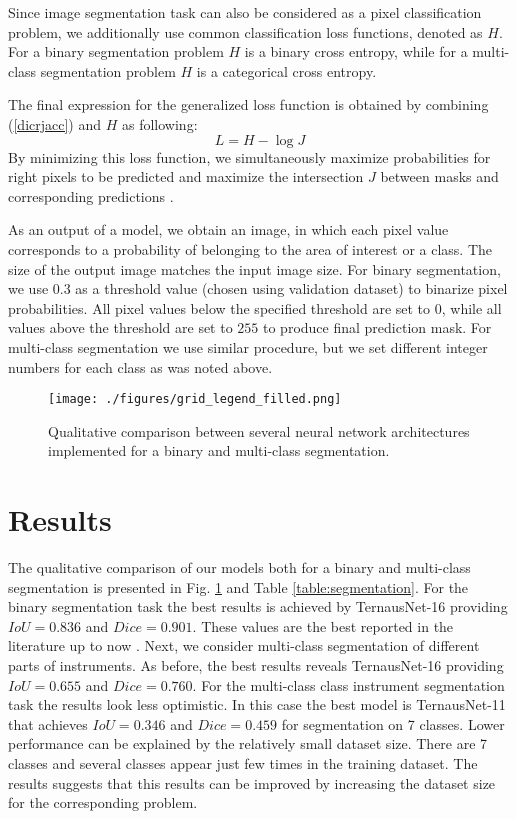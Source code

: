 \documentclass[runningheads,a4paper]{llncs}[2015/06/24]
\begin{document}
Since image segmentation task can also be considered as a pixel classification problem, we additionally use common classification loss functions, denoted as $H$. For a binary segmentation problem $H$ is a binary cross entropy, while for a multi-class segmentation problem $H$ is a categorical cross entropy.

The final expression for the generalized loss function is obtained by combining (\ref{dicrjacc}) and $H$ as following:
\begin{equation}
\label{free_en}
L=H-\log J
\end{equation}
By minimizing this loss function, we simultaneously maximize probabilities for right pixels to be predicted and maximize the intersection $J$ between masks and corresponding predictions \cite{iglovikov2017satellite}.

As an output of a model, we obtain an image, in which each pixel value corresponds to a probability of belonging to the area of interest or a class. The size of the output image matches the input image size. For binary segmentation, we use $0.3$ as a threshold value (chosen using validation dataset) to binarize pixel probabilities. All pixel values below the specified threshold are set to $0$, while all values above the threshold are set to $255$ to produce final prediction mask. For multi-class segmentation we use similar procedure, but we set different integer numbers for each class as was noted above.

\begin{figure}[!t]
\centering
\texttt{[image: ./figures/grid\_legend\_filled.png]}
\caption{Qualitative comparison between several  neural network architectures implemented for a binary and multi-class segmentation.}
\label{fig::grid_legend}
\end{figure}

\section{Results}
The qualitative comparison of our models both for a binary and multi-class segmentation is presented in Fig. \ref{fig::grid_legend} and Table \ref{table:segmentation}. For the binary segmentation task the best results is achieved by TernausNet-16 providing $IoU = 0.836$ and $Dice = 0.901$. These values are the best reported in the literature up to now \cite{pakhomov2017deep, garcia2017toolnet}. Next, we consider multi-class segmentation of different parts of instruments. As before, the best results reveals TernausNet-16 providing $IoU = 0.655$ and $Dice = 0.760$. For the multi-class class instrument segmentation task the results look less optimistic. In this case the best model is TernausNet-11 that achieves $IoU = 0.346$ and $Dice= 0.459$ for segmentation on 7 classes. Lower performance can be explained by the relatively small dataset size. There are 7 classes and several classes appear just few times in the training dataset.
The results suggests that this results can be  improved by increasing the dataset size for the corresponding problem.
\end{document}
